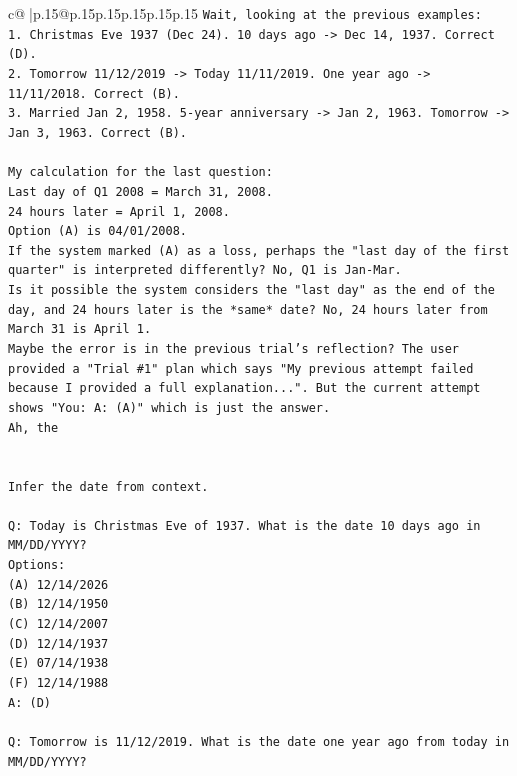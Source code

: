 \documentclass{article}
\begin{document}
{\begin{supertabular}{c@{$\;$}|p{.15\linewidth}@{}p{.15\linewidth}p{.15\linewidth}p{.15\linewidth}p{.15\linewidth}p{.15\linewidth}}
{{{\texttt{Wait, looking at the previous examples:} \\
\texttt{1. Christmas Eve 1937 (Dec 24). 10 days ago {-}> Dec 14, 1937. Correct (D).} \\
\texttt{2. Tomorrow 11/12/2019 {-}> Today 11/11/2019. One year ago {-}> 11/11/2018. Correct (B).} \\
\texttt{3. Married Jan 2, 1958. 5{-}year anniversary {-}> Jan 2, 1963. Tomorrow {-}> Jan 3, 1963. Correct (B).} \\
\\ 
\texttt{My calculation for the last question:} \\
\texttt{Last day of Q1 2008 = March 31, 2008.} \\
\texttt{24 hours later = April 1, 2008.} \\
\texttt{Option (A) is 04/01/2008.} \\
\texttt{If the system marked (A) as a loss, perhaps the "last day of the first quarter" is interpreted differently? No, Q1 is Jan{-}Mar.} \\
\texttt{Is it possible the system considers the "last day" as the end of the day, and 24 hours later is the *same* date? No, 24 hours later from March 31 is April 1.} \\
\texttt{Maybe the error is in the previous trial's reflection? The user provided a "Trial \#1" plan which says "My previous attempt failed because I provided a full explanation...". But the current attempt shows "You: A: (A)" which is just the answer.} \\
\texttt{Ah, the} \\
\\ 
\\ 
\texttt{Infer the date from context.} \\
\\ 
\texttt{Q: Today is Christmas Eve of 1937. What is the date 10 days ago in MM/DD/YYYY?} \\
\texttt{Options:} \\
\texttt{(A) 12/14/2026} \\
\texttt{(B) 12/14/1950} \\
\texttt{(C) 12/14/2007} \\
\texttt{(D) 12/14/1937} \\
\texttt{(E) 07/14/1938} \\
\texttt{(F) 12/14/1988} \\
\texttt{A: (D)} \\
\\ 
\texttt{Q: Tomorrow is 11/12/2019. What is the date one year ago from today in MM/DD/YYYY?} \\
}}}
\end{supertabular}}
\end{document}
